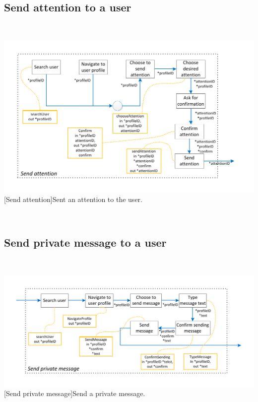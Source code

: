 \documentclass[11pt, a4paper,svglistings,oneside]{book}
\begin{document}
\subsection{Send attention to a user}

$\;$ \\
\noindent\begin{minipage}{\textwidth}
    \centering
   \includegraphics[scale=1]{nav_SendAttention.pdf}
 [Send attention]{Sent an attention to the user.}
\end{minipage}
$\;$ \\ 

\subsection{Send private message to a user}

$\;$ \\
\noindent\begin{minipage}{\textwidth}
    \centering
   \includegraphics[scale=1]{nav_SendPrivateMessage.pdf}
 [Send private message]{Send a private message.}
\end{minipage}
$\;$ \\ 
\end{document}
